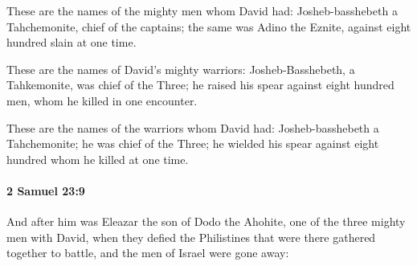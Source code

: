 			\begin{versebox}
					\item[BHS] 
					\item[ASV] These are the names of the mighty men whom David had: Josheb-basshebeth a Tahchemonite, chief of the captains; the same was Adino the Eznite, against eight hundred slain at one time.
					\item[NIV] These are the names of David’s mighty warriors: Josheb-Basshebeth, a Tahkemonite, was chief of the Three; he raised his spear against eight hundred men, whom he killed in one encounter.
					\item[NRSV] These are the names of the warriors whom David had: Josheb-basshebeth a Tahchemonite; he was chief of the Three; he wielded his spear against eight hundred whom he killed at one time.
			\end{versebox}

		\paragraph{2 Samuel 23:9} %
			\label{2SAMUEL-23-9}

			And after him was Eleazar the son of Dodo the Ahohite, one of the three mighty men with David, when they defied the Philistines that were there gathered together to battle, and the men of Israel were gone away:


